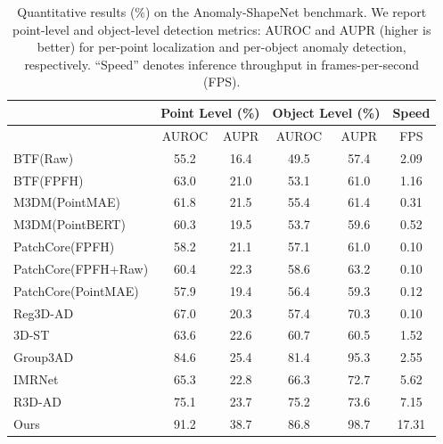 \begin{table}[ht]
\centering
\caption{Quantitative results (\%) on the Anomaly-ShapeNet benchmark. We report point-level and object-level detection metrics: AUROC and AUPR (higher is better) for per-point localization and per-object anomaly detection, respectively. ``Speed'' denotes inference throughput in frames-per-second (FPS).}
\label{tab:ShapeNet}
\begin{tabular}{l|cc|cc|c}
\hline
& \multicolumn{2}{c|}{Point Level (\%)} & \multicolumn{2}{c|}{Object Level (\%)} & Speed \\
\hline
& AUROC & AUPR & AUROC & AUPR & FPS \\ 
\hline
BTF(Raw)                            & 55.2 & 16.4  & 49.5 & 57.4  & 2.09 \\ 
BTF(FPFH)                           & 63.0 & 21.0  & 53.1 & 61.0  & 1.16 \\ 
M3DM(PointMAE)                      & 61.8 & 21.5  & 55.4 & 61.4  & 0.31 \\ 
M3DM(PointBERT)                     & 60.3 & 19.5  & 53.7 & 59.6  & 0.52 \\ 
PatchCore(FPFH)                     & 58.2 & 21.1  & 57.1 & 61.0  & 0.10 \\ 
PatchCore(FPFH+Raw)                 & 60.4 & 22.3  & 58.6 & 63.2  & 0.10 \\ 
PatchCore(PointMAE)                 & 57.9 & 19.4  & 56.4 & 59.3  & 0.12 \\ 
Reg3D-AD \cite{liu2023real3d}       & 67.0 & 20.3  & 57.4 & 70.3  & 0.10 \\ 
3D-ST \cite{bergmann2023anomaly}    & 63.6 & 22.6  & 60.7 & 60.5  & 1.52 \\
Group3AD \cite{zhu2024towards}      & 84.6 & 25.4  & 81.4 & 95.3  & 2.55 \\ 
IMRNet \cite{li2024towards}         & 65.3 & 22.8  & 66.3 & 72.7  & 5.62 \\
R3D-AD \cite{zhou2024r3d}           & 75.1 & 23.7  & 75.2 & 73.6  & 7.15 \\
Ours                                & 91.2 & 38.7  & 86.8 & 98.7  & 17.31 \\
\hline
\end{tabular}
\end{table}

